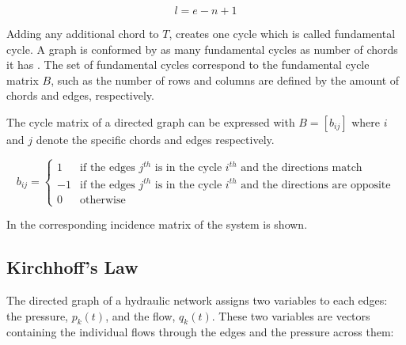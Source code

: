 \begin{equation}
  \label{Numberofchords}
  l = e - n +1
\end{equation}

Adding any additional chord to $T$, creates one cycle which is called fundamental cycle. A graph is conformed by as many fundamental cycles as number of chords it has \cite{GraphModel}.  
The set of fundamental cycles correspond to the fundamental cycle matrix $B$, such as the number of rows and columns are defined by the amount of chords and edges, respectively. 

The cycle matrix of a directed graph can be expressed with $B = [b_{ij}]$ where $i$ and $j$ denote the specific chords and 
edges respectively. 

\begin{equation}
\label{DiGraphCycle}
 b_{ij} =
		\left\{
		\begin{array}{ll}
		
		1 			&      \text{if the edges $j^{th}$ is in the cycle $i^{th}$ and the directions match}	
\\
		-1                       &     \text{if the edges $j^{th}$ is in the cycle $i^{th}$ and the directions are opposite}
\\

                0                       &      \text{otherwise}

		\end{array}
		\right.
\end{equation}	

In  the corresponding incidence matrix of the system is 
shown.

\subsection{Kirchhoff's Law}
\label{KirchhoffSection}

The directed graph of a hydraulic network assigns two variables to each edges: 
the pressure, $p_k(t)$, and the flow, $q_k(t)$. These two variables are vectors containing the individual flows through the edges and 
the pressure across them:


